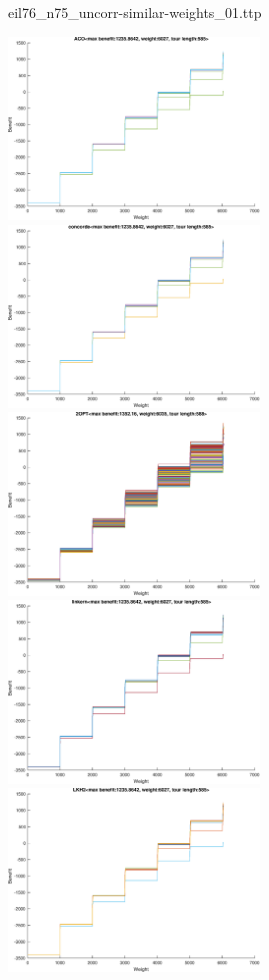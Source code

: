 \documentclass{article}
\begin{document}
\newpage
eil76\_n75\_uncorr-similar-weights\_01.ttp

\noindent
\includegraphics[width=0.5\textwidth]{eil76figs/eil76_n75_uncorr-similar-weights_01.ttp.aco.txt.eps}
\includegraphics[width=0.5\textwidth]{eil76figs/eil76_n75_uncorr-similar-weights_01.ttp.con.txt.eps}
\includegraphics[width=0.5\textwidth]{eil76figs/eil76_n75_uncorr-similar-weights_01.ttp.inv.txt.eps}
\includegraphics[width=0.5\textwidth]{eil76figs/eil76_n75_uncorr-similar-weights_01.ttp.lkh.txt.eps}
\includegraphics[width=0.5\textwidth]{eil76figs/eil76_n75_uncorr-similar-weights_01.ttp.lkh2.txt.eps}
\end{document}
